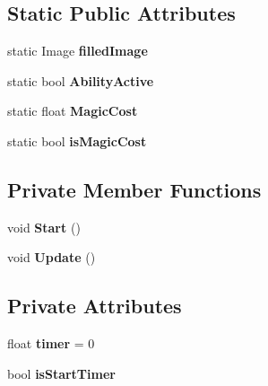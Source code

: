 \subsection*{Static Public Attributes}
\begin{DoxyCompactItemize}
\item 
\mbox{\label{class_ability_control1_a3a000bd45fe3ebc055c41013a7a79229}} 
static Image {\bfseries filled\+Image}
\item 
\mbox{\label{class_ability_control1_a8c5e7736a165fd9d9220d5fbfbb8b912}} 
static bool {\bfseries Ability\+Active}
\item 
\mbox{\label{class_ability_control1_a69f6ba44c3e4e2e690c59470f305638d}} 
static float {\bfseries Magic\+Cost}
\item 
\mbox{\label{class_ability_control1_a287f1332b8bb8fe0c912357312228282}} 
static bool {\bfseries is\+Magic\+Cost}
\end{DoxyCompactItemize}
\subsection*{Private Member Functions}
\begin{DoxyCompactItemize}
\item 
\mbox{\label{class_ability_control1_afa305ca91d2106c503a8f7fb6628e0fb}} 
void {\bfseries Start} ()
\item 
\mbox{\label{class_ability_control1_ab8c8b7a0cea14ace3f5ce135bfcca79b}} 
void {\bfseries Update} ()
\end{DoxyCompactItemize}
\subsection*{Private Attributes}
\begin{DoxyCompactItemize}
\item 
\mbox{\label{class_ability_control1_aa679d7281091d8ab98a00ef1cfece8b3}} 
float {\bfseries timer} = 0
\item 
\mbox{\label{class_ability_control1_a1c132bb09a8c829c60eb613903688081}} 
bool {\bfseries is\+Start\+Timer}
\end{DoxyCompactItemize}


